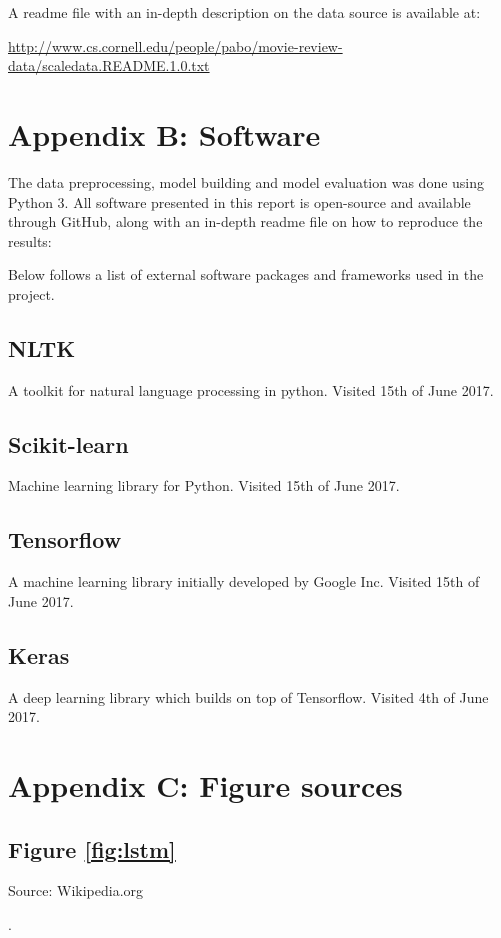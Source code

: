 \documentclass[a4paper]{article}
\begin{document}
A readme file with an in-depth description on the data source is available at:

\url{http://www.cs.cornell.edu/people/pabo/movie-review-data/scaledata.README.1.0.txt}

\pagebreak
\section{Appendix B: Software}
\label{app:B}
The data preprocessing, model building and model evaluation was done using
Python 3.
All software presented in this report is open-source and available through
GitHub, along with an in-depth readme file on how
to reproduce the results:


Below follows a list of external software packages and frameworks used in
the project.

\subsection{NLTK}
A toolkit for natural language processing in python. Visited 15th of June 2017.


\subsection{Scikit-learn}
Machine learning library for Python. Visited 15th of June 2017.


\subsection{Tensorflow}
A machine learning library initially developed by Google Inc.
Visited 15th of June 2017.


\subsection{Keras}
A deep learning library which builds on top of Tensorflow.
Visited 4th of June 2017.


\pagebreak
\section{Appendix C: Figure sources}
\subsection{Figure \ref{fig:lstm}}
Source: Wikipedia.org

.
\end{document}
